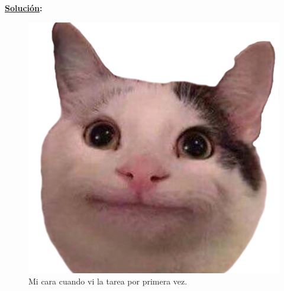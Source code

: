 \documentclass[11pt,letterpaper]{report}
\newcommand{\sol}{\textbf{\underline{Solución}: }} %
\begin{document}
\begin{enumerate}
\sol













\begin{figure}[H]
        \centering
        \includegraphics[scale=0.25]{gato.png}
        \caption{Mi cara cuando vi la tarea por primera vez.}
\end{figure}

\end{enumerate}



\end{document}
